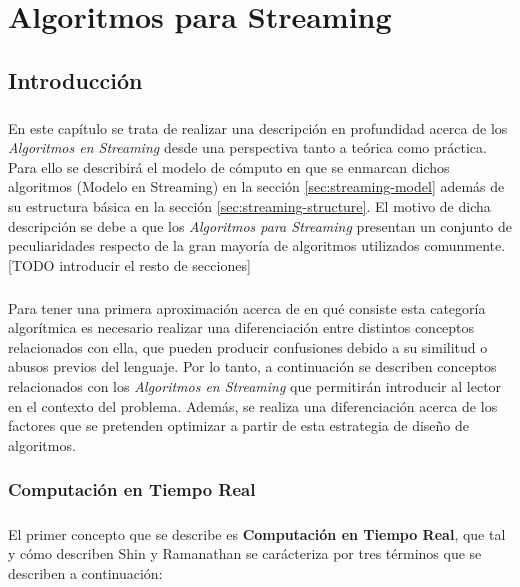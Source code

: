 \documentclass{subfiles}
\begin{document}
  \chapter{Algoritmos para Streaming}
  \label{chapter:streaming}


    \section{Introducción}
    \label{sec:streaming-intro}

      \paragraph{}
      En este capítulo se trata de realizar una descripción en profundidad acerca de los \emph{Algoritmos en Streaming} desde una perspectiva tanto a teórica como práctica. Para ello se describirá el modelo de cómputo en que se enmarcan dichos algoritmos (Modelo en Streaming) en la sección \ref{sec:streaming-model} además de su estructura básica en la sección \ref{sec:streaming-structure}. El motivo de dicha descripción se debe a que los \emph{Algoritmos para Streaming} presentan un conjunto de peculiaridades respecto de la gran mayoría de algoritmos utilizados comunmente. [TODO introducir el resto de secciones]

      \paragraph{}
      Para tener una primera aproximación acerca de en qué consiste esta categoría algorítmica es necesario realizar una diferenciación entre distintos conceptos relacionados con ella, que pueden producir confusiones debido a su similitud o abusos previos del lenguaje. Por lo tanto, a continuación se describen conceptos relacionados con los \emph{Algoritmos en Streaming} que permitirán introducir al lector en el contexto del problema. Además, se realiza una diferenciación acerca de los factores que se pretenden optimizar a partir de esta estrategia de diseño de algoritmos.


      \subsection{Computación en Tiempo Real}

        \paragraph{}
        El primer concepto que se describe es \textbf{Computación en Tiempo Real}, que tal y cómo describen Shin y Ramanathan \cite{259423} se carácteriza por tres términos que se describen a continuación:
\end{document}
